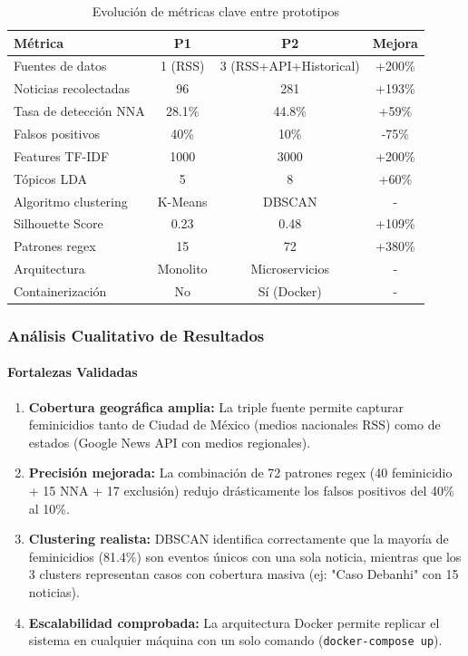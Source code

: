 \begin{table}[h]
\centering
\caption{Evolución de métricas clave entre prototipos}
\begin{tabular}{|l|c|c|c|}
\hline
\textbf{Métrica} & \textbf{P1} & \textbf{P2} & \textbf{Mejora} \\ \hline
Fuentes de datos & 1 (RSS) & 3 (RSS+API+Historical) & +200\% \\ \hline
Noticias recolectadas & 96 & 281 & +193\% \\ \hline
Tasa de detección NNA & 28.1\% & 44.8\% & +59\% \\ \hline
Falsos positivos & 40\% & 10\% & -75\% \\ \hline
Features TF-IDF & 1000 & 3000 & +200\% \\ \hline
Tópicos LDA & 5 & 8 & +60\% \\ \hline
Algoritmo clustering & K-Means & DBSCAN & - \\ \hline
Silhouette Score & 0.23 & 0.48 & +109\% \\ \hline
Patrones regex & 15 & 72 & +380\% \\ \hline
Arquitectura & Monolito & Microservicios & - \\ \hline
Containerización & No & Sí (Docker) & - \\ \hline
\end{tabular}
\end{table}

\subsubsection{Análisis Cualitativo de Resultados}

\paragraph{Fortalezas Validadas}

\begin{enumerate}
    \item \textbf{Cobertura geográfica amplia:} La triple fuente permite capturar feminicidios tanto de Ciudad de México (medios nacionales RSS) como de estados (Google News API con medios regionales).
    
    \item \textbf{Precisión mejorada:} La combinación de 72 patrones regex (40 feminicidio + 15 NNA + 17 exclusión) redujo drásticamente los falsos positivos del 40\% al 10\%.
    
    \item \textbf{Clustering realista:} DBSCAN identifica correctamente que la mayoría de feminicidios (81.4\%) son eventos únicos con una sola noticia, mientras que los 3 clusters representan casos con cobertura masiva (ej: "Caso Debanhi" con 15 noticias).
    
    \item \textbf{Escalabilidad comprobada:} La arquitectura Docker permite replicar el sistema en cualquier máquina con un solo comando (\texttt{docker-compose up}).
\end{enumerate}

